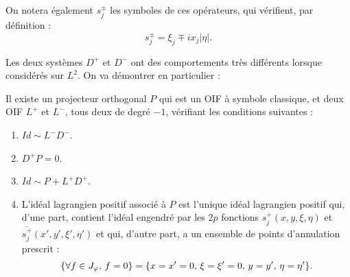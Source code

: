 \noindent On notera également $s_j^{\pm}$ les symboles de ces opérateurs, qui vérifient, par définition :
\begin{equation*}
  s^{\pm}_j = \xi_j \mp i x_j|\eta|.
\end{equation*}

Les deux systèmes $D^+$ et $D^-$ ont des comportements très différents lorsque considérés sur $L^2$. On va démontrer en particulier :

\begin{prop}
Il existe un projecteur orthogonal $P$ qui est un OIF à symbole classique, et deux OIF $L^+$ et $L^-$, tous deux de degré $-1$, vérifiant les conditions suivantes :

\begin{enumerate}
  \item $Id \sim L^-D^-$.
  \item $D^+P =0$.
  \item $Id \sim P + L^+D^+$.
  \item L'idéal lagrangien positif associé à $P$ est l'unique idéal lagrangien positif qui, d'une part, contient l'idéal engendré par les $2p$ fonctions $s_j^+(x,y,\xi,\eta)$ et  $\overline{s_j^+}(x',y',\xi',\eta')$ et qui, d'autre part, a un ensemble de points d'annulation prescrit :
  \begin{equation*}
  	\{\forall f \in J_{\varphi},\, f=0\} = \{x=x'=0, \, \xi=\xi'=0,\, y=y',\, \eta=\eta'\}.
  \end{equation*}
\end{enumerate}
\end{prop}
